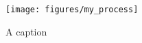 \begin{figure}[!htbp]
\begin{center}
\texttt{[image: figures/my\_process]}%
\end{center}
\caption{A caption}
\label{my_proc}
\end{figure}

